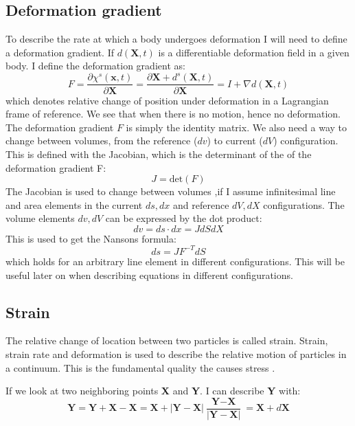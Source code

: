 \subsection{Deformation gradient}
To describe the rate at which a body undergoes deformation I will need to define a deformation gradient.
If $d(\textbf{X},t)$ is a differentiable deformation field in a given body. I define the deformation gradient as:  
\begin{equation}
\label{eq:deformation_gradient}
F = \frac{\partial \chi^s(\textbf{x},t)}{\partial \textbf{X}} = \frac{\partial \textbf{X}  + d^s(\textbf{X} ,t) }{\partial \textbf{X}} =  I + \nabla d(\textbf{X},t) 
\end{equation}
which denotes relative change of position under deformation in a Lagrangian frame of reference. We see that when there is no motion, hence no deformation. The deformation gradient $F$ is simply the identity matrix. \newline
We also need a way to change between volumes, from the reference ($dv$) to current ($dV$) configuration. This is defined with the Jacobian, which is the determinant of the of the deformation gradient F:
\begin{equation}\label{eq:J}
J = \text{det}(F)
\end{equation}
The Jacobian is used to change between volumes ,if I assume infinitesimal line and area elements in the current $ds, dx$ and reference $dV,dX$ configurations. The volume elements $dv, dV$ can be expressed by the dot product:
\begin{equation}
 dv = ds\cdot dx = J dS dX
\end{equation}
This is used to get the Nansons formula:
\begin{equation}\label{eq:Nanson}
ds = JF^{-T}dS
\end{equation}
which holds for an arbitrary line element in different configurations. This will be useful later on when describing equations in different configurations.

\subsection{Strain}
The relative change of location between two particles is called strain. Strain, strain rate and deformation is used to describe the relative motion of particles in a continuum. This is the fundamental quality the causes stress \cite{Richter2016}.

If we look at two neighboring points \textbf{X} and \textbf{Y}. I can describe \textbf{Y} with:
\begin{equation}
\textbf{Y} = \textbf{Y} + \textbf{X} - \textbf{X} = \textbf{X} + |\textbf{Y} - \textbf{X}| \frac{\textbf{Y} - \textbf{X}}{|\textbf{Y} - \textbf{X}|} = \textbf{X} + d\textbf{X}
\end{equation}

